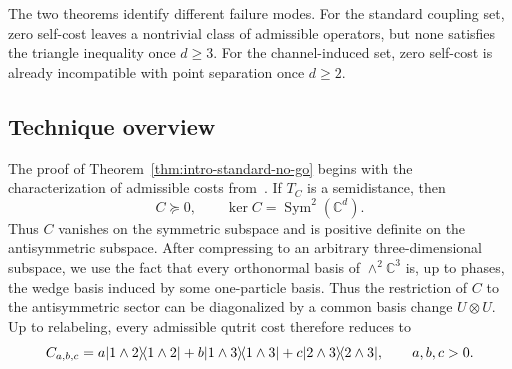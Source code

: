 \documentclass[11pt]{article}
\newcommand{\ketbra}[2]{\ensuremath{\ket{#1}\!\bra{#2}}}
\DeclarePairedDelimiter\ket{\lvert}{\rangle}
\DeclarePairedDelimiter\bra{\langle}{\rvert}
\begin{document}
The two theorems identify different failure modes.  For the standard
coupling set, zero self-cost leaves a nontrivial class of admissible
operators, but none satisfies the triangle inequality once $d\geq 3$.  For
the channel-induced set, zero self-cost is already incompatible with point
separation once $d\geq 2$.


\subsection{Technique overview}

The proof of Theorem~\ref{thm:intro-standard-no-go} begins with the
characterization of admissible costs from~\cite{CEFZ23}.  If $T_C$ is a
semidistance, then
\begin{equation}\label{eq:intro-admissible}
    C\succeq 0,
    \qquad
    \ker C=\operatorname{Sym}^2(\mathbb{C}^d).
\end{equation}
Thus $C$ vanishes on the symmetric subspace and is positive definite on the
antisymmetric subspace.  After compressing to an arbitrary
three-dimensional subspace, we use the fact that every orthonormal basis of
$\wedge^2\mathbb{C}^3$ is, up to phases, the wedge basis induced by some
one-particle basis.  Thus the restriction of $C$ to the antisymmetric sector
can be diagonalized by a common basis change $U\otimes U$.  Up to relabeling,
every admissible qutrit cost therefore reduces to
\begin{equation}\label{eq:intro-weighted-cost}
    C_{a,b,c}
    =
    a\ketbra{1\wedge 2}{1\wedge 2}
    +b\ketbra{1\wedge 3}{1\wedge 3}
    +c\ketbra{2\wedge 3}{2\wedge 3},
    \qquad a,b,c>0.
\end{equation}
\end{document}
